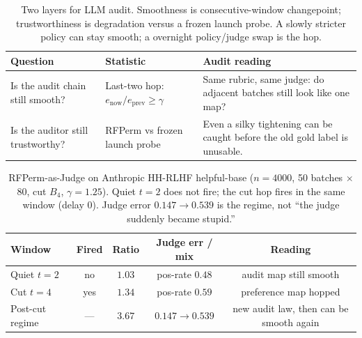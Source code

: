 
\begin{table}[ht]
\centering
\caption{Two layers for LLM audit. Smoothness is consecutive-window
changepoint; trustworthiness is degradation versus a frozen launch probe.
A slowly stricter policy can stay smooth; a overnight policy/judge swap is the hop.}
\label{tab:llm-audit-two-layers}
\small
\begin{tabular}{@{}p{3.4cm}p{4.2cm}p{5.2cm}@{}}
\toprule
Question & Statistic & Audit reading \\
\midrule
Is the audit chain still smooth? &
Last-two hop: \(e_{\mathrm{now}}/e_{\mathrm{prev}}\ge\gamma\) &
Same rubric, same judge: do adjacent batches still look like one map? \\
Is the auditor still trustworthy? &
RFPerm vs frozen launch probe &
Even a silky tightening can be caught before the old gold label is unusable. \\
\bottomrule
\end{tabular}
\end{table}

\begin{table}[ht]
\centering
\caption{RFPerm-as-Judge on Anthropic HH-RLHF helpful-base
(\(n=4000\), 50 batches \(\times\) 80, cut \(B_4\), \(\gamma=1.25\)).
Quiet \(t=2\) does not fire; the cut hop fires in the same window (delay 0).
Judge error \(0.147\to 0.539\) is the regime, not ``the judge suddenly became stupid.''}
\label{tab:llm-audit-hh}
\small
\setlength{\tabcolsep}{3.5pt}
\begin{tabular}{@{}l c c c c@{}}
\toprule
Window & Fired & Ratio & Judge err / mix & Reading \\
\midrule
Quiet \(t=2\) & no & \(1.03\) & pos-rate \(0.48\) & audit map still smooth \\
Cut \(t=4\) & yes & \(1.34\) & pos-rate \(0.59\) & preference map hopped \\
Post-cut regime & --- & \(3.67\) & \(0.147\to 0.539\) & new audit law, then can be smooth again \\
\bottomrule
\end{tabular}
\end{table}

